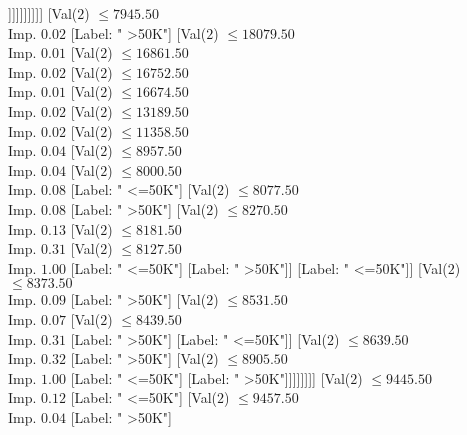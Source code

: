 \documentclass[margin=10pt]{standalone}
\begin{document}
\begin{forest}
																				[Label: " <=50K"]]]]]]]]]]
											[Val($2$) $ \leq 7945.50$ \\ Imp. $0.02$
												[Label: " >50K"]
												[Val($2$) $ \leq 18079.50$ \\ Imp. $0.01$
													[Val($2$) $ \leq 16861.50$ \\ Imp. $0.02$
														[Val($2$) $ \leq 16752.50$ \\ Imp. $0.01$
															[Val($2$) $ \leq 16674.50$ \\ Imp. $0.02$
																[Val($2$) $ \leq 13189.50$ \\ Imp. $0.02$
																	[Val($2$) $ \leq 11358.50$ \\ Imp. $0.04$
																		[Val($2$) $ \leq 8957.50$ \\ Imp. $0.04$
																			[Val($2$) $ \leq 8000.50$ \\ Imp. $0.08$
																				[Label: " <=50K"]
																				[Val($2$) $ \leq 8077.50$ \\ Imp. $0.08$
																					[Label: " >50K"]
																					[Val($2$) $ \leq 8270.50$ \\ Imp. $0.13$
																						[Val($2$) $ \leq 8181.50$ \\ Imp. $0.31$
																							[Val($2$) $ \leq 8127.50$ \\ Imp. $1.00$
																								[Label: " <=50K"]
																								[Label: " >50K"]]
																							[Label: " <=50K"]]
																						[Val($2$) $ \leq 8373.50$ \\ Imp. $0.09$
																							[Label: " >50K"]
																							[Val($2$) $ \leq 8531.50$ \\ Imp. $0.07$
																								[Val($2$) $ \leq 8439.50$ \\ Imp. $0.31$
																									[Label: " >50K"]
																									[Label: " <=50K"]]
																								[Val($2$) $ \leq 8639.50$ \\ Imp. $0.32$
																									[Label: " >50K"]
																									[Val($2$) $ \leq 8905.50$ \\ Imp. $1.00$
																										[Label: " <=50K"]
																										[Label: " >50K"]]]]]]]]
																			[Val($2$) $ \leq 9445.50$ \\ Imp. $0.12$
																				[Label: " <=50K"]
																				[Val($2$) $ \leq 9457.50$ \\ Imp. $0.04$
																					[Label: " >50K"]

\end{forest}
\end{document}
